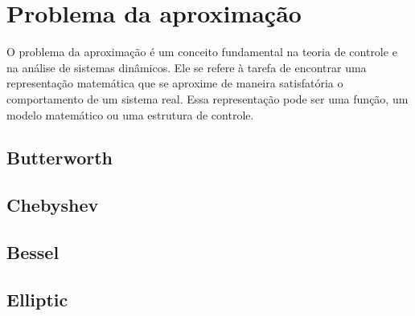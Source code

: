 
\chapter{Problema da aproximação}
\label{chap: aproximacao}

O problema da aproximação é um conceito fundamental na teoria de controle e na análise de sistemas dinâmicos. Ele se refere à tarefa de encontrar uma representação matemática que se aproxime de maneira satisfatória o comportamento de um sistema real. Essa representação pode ser uma função, um modelo matemático ou uma estrutura de controle.

\section{Butterworth}

\section{Chebyshev}

\section{Bessel}

\section{Elliptic}
